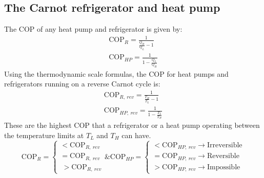 \documentclass[class=report, crop=false, 12pt,a4paper]{standalone}
\begin{document}
\subsection{The Carnot refrigerator and heat pump}
The COP of any heat pump and refrigerator is given by:
\begin{align}
  \textrm{COP}_R = \frac{1}{\frac{Q_H}{Q_L} - 1}  \\
  \textrm{COP}_{HP} = \frac{1}{1 - \frac{Q_L}{Q_H}}
\end{align}
Using the thermodynamic scale formulas, the COP for heat pumps and refrigerators running on a reverse Carnot cycle is:
\begin{align}
  \textrm{COP}_{R, \ rev} = \frac{1}{\frac{T_H}{T_L} - 1}  \\
  \textrm{COP}_{HP, \ rev} = \frac{1}{1 - \frac{T_L}{T_H}} 
\end{align}
These are the highest COP that a refrigerator or a heat pump operating between the temperature limits at $T_L$ and $T_H$ can have.
\begin{equation}  
  \textrm{COP}_{R} = 
    \begin{cases}
      < \textrm{COP}_{R, \ rev}\\
      = \textrm{COP}_{R, \ rev}\\\
      > \textrm{COP}_{R, \ rev}
    \end{cases}
  \textrm{\& COP}_{HP} = 
    \begin{cases}
      < \textrm{COP}_{HP, \ rev} \rightarrow \textrm{Irreversible}\\
      = \textrm{COP}_{HP, \ rev} \rightarrow \textrm{Reversible}\\
      > \textrm{COP}_{HP, \ rev} \rightarrow \textrm{Impossible}
    \end{cases}
\end{equation}
\end{document}
